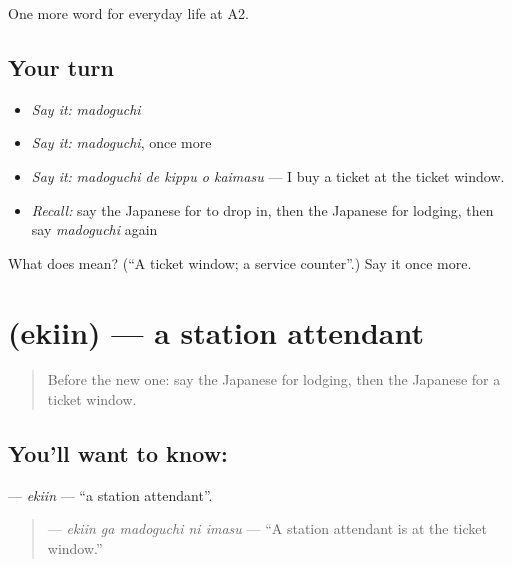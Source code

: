 \begin{grammarlens}[title={What you've built}]
One more word for everyday life at A2.
\end{grammarlens}

\subsection*{Your turn}
\begin{itemize}
\raggedright
  \item \emph{Say it:} \emph{madoguchi}
  \item \emph{Say it:} \emph{madoguchi}, once more
  \item \emph{Say it:} \emph{madoguchi de kippu o kaimasu} — I buy a ticket at the ticket window.
  \item \emph{Recall:} say the Japanese for to drop in, then the Japanese for lodging, then say \emph{madoguchi} again
\end{itemize}

\begin{tcolorbox}[breakable,colback=teal!4,colframe=teal!35!black,title={Before you move on}]
What does  mean? (\textquotedblleft{}A ticket window; a service counter\textquotedblright{}.) Say it once more.
\end{tcolorbox}
\section[\texorpdfstring{\ja{えきいん} (ekiin)}{えきいん (ekiin)}]{ (ekiin) — a station attendant}

\label{lesson:JA-C205-ekiin}



\begin{quote}
Before the new one: say the Japanese for lodging, then the Japanese for a ticket window.
\end{quote}

\subsection*{You'll want to know: }
\textbf{} — \emph{ekiin} — \textquotedblleft{}a station attendant\textquotedblright{}.

\begin{quote}
\textbf{  } — \emph{ekiin ga madoguchi ni imasu} — \textquotedblleft{}A station attendant is at the ticket window.\textquotedblright{}
\end{quote}

